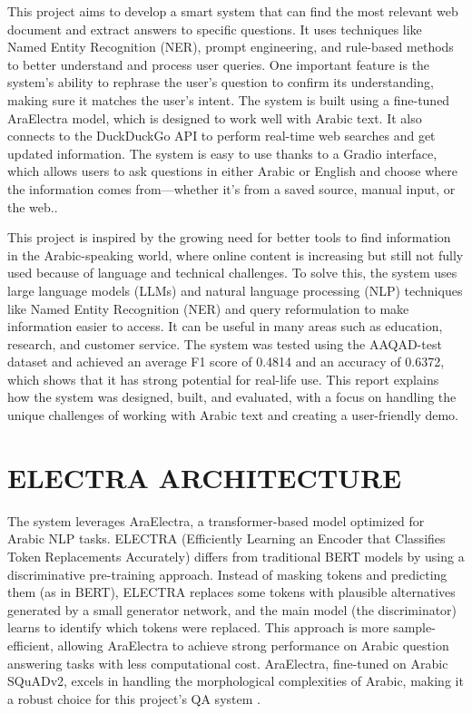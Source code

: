 \documentclass[conference]{IEEEtran}
\begin{document}
This project aims to develop a smart system that can find the most relevant web document and extract answers to specific questions. It uses techniques like Named Entity Recognition (NER), prompt engineering, and rule-based methods to better understand and process user queries. One important feature is the system’s ability to rephrase the user’s question to confirm its understanding, making sure it matches the user’s intent. The system is built using a fine-tuned AraElectra model, which is designed to work well with Arabic text. It also connects to the DuckDuckGo API to perform real-time web searches and get updated information. The system is easy to use thanks to a Gradio interface, which allows users to ask questions in either Arabic or English and choose where the information comes from—whether it's from a saved source, manual input, or the web.\cite{b2}.

This project is inspired by the growing need for better tools to find information in the Arabic-speaking world, where online content is increasing but still not fully used because of language and technical challenges. To solve this, the system uses large language models (LLMs) and natural language processing (NLP) techniques like Named Entity Recognition (NER) and query reformulation to make information easier to access. It can be useful in many areas such as education, research, and customer service. The system was tested using the AAQAD-test dataset and achieved an average F1 score of 0.4814 and an accuracy of 0.6372, which shows that it has strong potential for real-life use. This report explains how the system was designed, built, and evaluated, with a focus on handling the unique challenges of working with Arabic text and creating a user-friendly demo.

\section {ELECTRA ARCHITECTURE}
The system leverages AraElectra, a transformer-based model optimized for Arabic NLP tasks. ELECTRA (Efficiently Learning an Encoder that Classifies Token Replacements Accurately) differs from traditional BERT models by using a discriminative pre-training approach. Instead of masking tokens and predicting them (as in BERT), ELECTRA replaces some tokens with plausible alternatives generated by a small generator network, and the main model (the discriminator) learns to identify which tokens were replaced. This approach is more sample-efficient, allowing AraElectra to achieve strong performance on Arabic question answering tasks with less computational cost. AraElectra, fine-tuned on Arabic SQuADv2, excels in handling the morphological complexities of Arabic, making it a robust choice for this project's QA system \cite{b3}.
\end{document}
